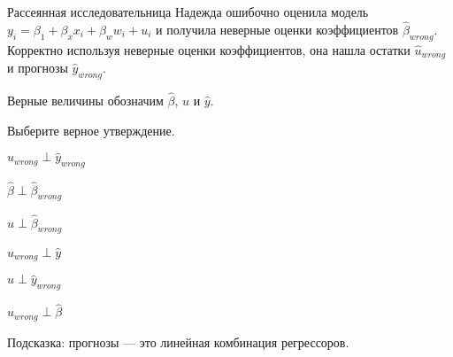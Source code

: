 
\begin{question}
Рассеянная исследовательница Надежда ошибочно оценила модель \(y_i = \beta_1 + \beta_x x_i + \beta_w w_i + u_i\) и получила неверные оценки коэффициентов \(\hat \beta_{wrong}\).
Корректно используя неверные оценки коэффициентов, она нашла остатки \(\hat u_{wrong}\) и прогнозы \(\hat y_{wrong}\).

Верные величины обозначим \(\hat \beta\), \(\hat u\) и \(\hat y\).

Выберите верное утверждение.
\begin{answerlist}
  \item \(\hat u_{wrong} \perp \hat y_{wrong}\)
  \item \(\hat \beta \perp \hat \beta_{wrong}\)
  \item \(\hat u \perp \hat \beta_{wrong}\)
  \item \(\hat u_{wrong} \perp \hat y\)
  \item \(\hat u \perp \hat y_{wrong}\)
  \item \(\hat u_{wrong} \perp \hat \beta\)
\end{answerlist}
\end{question}

\begin{solution}
Подсказка: прогнозы --- это линейная комбинация регрессоров.
\end{solution}

